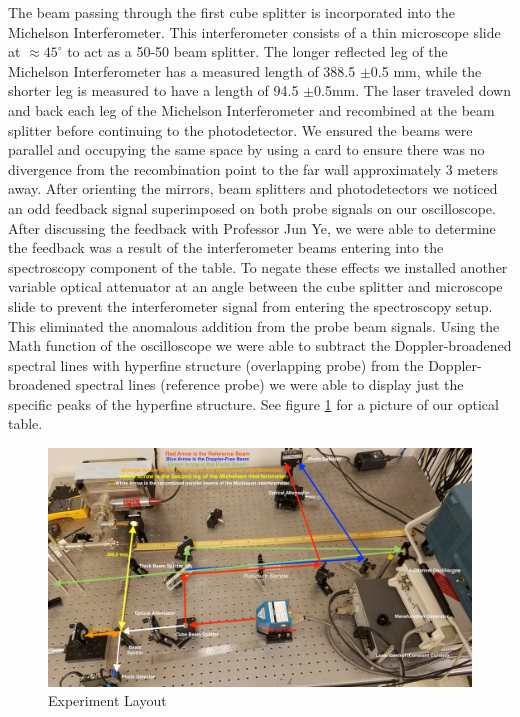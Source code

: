 \documentclass[12pt]{article}
\begin{document}
The beam passing through the first cube splitter is incorporated into the Michelson Interferometer.  This interferometer consists of a thin microscope slide at $\approx45^{\circ}$ to act as a 50-50 beam splitter. The longer reflected leg of the Michelson Interferometer has a measured length of 388.5 $\pm $0.5 mm, while the shorter leg is measured to have a length of 94.5 $\pm $0.5mm. The laser traveled down and back each leg of the Michelson Interferometer and recombined at the beam splitter before continuing to the photodetector.  We ensured the beams were parallel and occupying the same space by using a card to ensure there was no divergence from the recombination point to the far wall approximately 3 meters away. After orienting the mirrors, beam splitters and photodetectors we noticed an odd feedback signal superimposed on both probe signals on our oscilloscope. After discussing the feedback with Professor Jun Ye, we were able to determine the feedback was a result of the interferometer beams entering into the spectroscopy component of the table. To negate these effects we installed another variable optical attenuator at an angle between the cube splitter and microscope slide to prevent the interferometer signal from entering the spectroscopy setup.  This eliminated the anomalous addition from the probe beam signals.  Using the Math function of the oscilloscope we were able to subtract the Doppler-broadened spectral lines with hyperfine structure (overlapping probe) from the Doppler-broadened spectral lines (reference probe) we were able to display just the specific peaks of the hyperfine structure. See figure \ref{fig:Layout} for a picture of our optical table.

\begin{figure}[h!]
	\centering
	\includegraphics[width=\textwidth]{DFS_Layout.jpg}
	\caption{Experiment Layout}%
	\label{fig:Layout}%
\end{figure}
\end{document}
